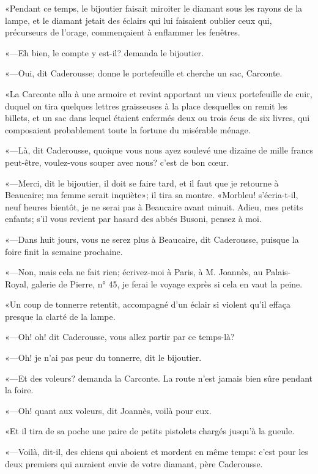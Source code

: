 «Pendant ce temps, le bijoutier faisait miroiter le diamant sous les rayons de la lampe, et le diamant jetait des éclairs qui lui faisaient oublier ceux qui, précurseurs de l'orage, commençaient à enflammer les fenêtres. 

«—Eh bien, le compte y est-il? demanda le bijoutier. 

«—Oui, dit Caderousse; donne le portefeuille et cherche un sac, Carconte. 

«La Carconte alla à une armoire et revint apportant un vieux portefeuille de cuir, duquel on tira quelques lettres graisseuses à la place desquelles on remit les billets, et un sac dans lequel étaient enfermés deux ou trois écus de six livres, qui composaient probablement toute la fortune du misérable ménage. 

«—Là, dit Caderousse, quoique vous nous ayez soulevé une dizaine de mille francs peut-être, voulez-vous souper avec nous? c'est de bon cœur. 

«—Merci, dit le bijoutier, il doit se faire tard, et il faut que je retourne à Beaucaire; ma femme serait inquiète»; il tira sa montre. «Morbleu! s'écria-t-il, neuf heures bientôt, je ne serai pas à Beaucaire avant minuit. Adieu, mes petits enfants; s'il vous revient par hasard des abbés Busoni, pensez à moi. 

«—Dans huit jours, vous ne serez plus à Beaucaire, dit Caderousse, puisque la foire finit la semaine prochaine. 

«—Non, mais cela ne fait rien; écrivez-moi à Paris, à M. Joannès, au Palais-Royal, galerie de Pierre, n° 45, je ferai le voyage exprès si cela en vaut la peine. 

«Un coup de tonnerre retentit, accompagné d'un éclair si violent qu'il effaça presque la clarté de la lampe. 

«—Oh! oh! dit Caderousse, vous allez partir par ce temps-là? 

«—Oh! je n'ai pas peur du tonnerre, dit le bijoutier. 

«—Et des voleurs? demanda la Carconte. La route n'est jamais bien sûre pendant la foire. 

«—Oh! quant aux voleurs, dit Joannès, voilà pour eux. 

«Et il tira de sa poche une paire de petits pistolets chargés jusqu'à la gueule. 

«—Voilà, dit-il, des chiens qui aboient et mordent en même temps: c'est pour les deux premiers qui auraient envie de votre diamant, père Caderousse. 


